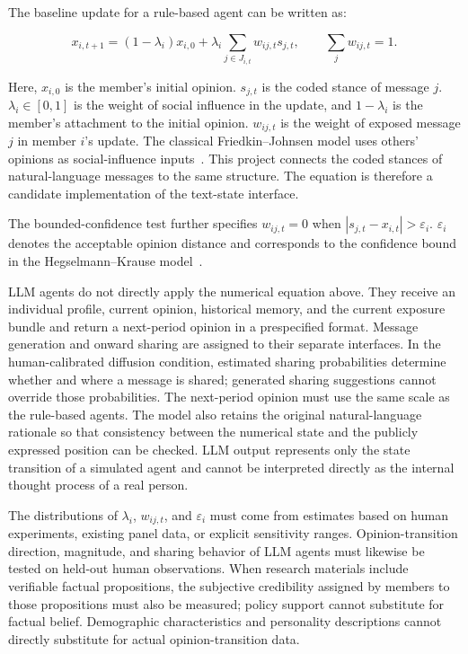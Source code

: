 \documentclass[11pt,a4paper]{article}
\begin{document}
The baseline update for a rule-based agent can be written as:

\begin{equation*}
x_{i,t+1}
=
(1-\lambda_i)x_{i,0}
+
\lambda_i
\sum_{j\in J_{i,t}}
w_{ij,t}s_{j,t},
\qquad
\sum_jw_{ij,t}=1.
\end{equation*}

Here, $x_{i,0}$ is the member's initial opinion. $s_{j,t}$ is the coded stance of message $j$. $\lambda_i\in[0,1]$ is the weight of social influence in the update, and $1-\lambda_i$ is the member's attachment to the initial opinion. $w_{ij,t}$ is the weight of exposed message $j$ in member $i$'s update. The classical Friedkin--Johnsen model uses others' opinions as social-influence inputs~\citep{friedkin1990}. This project connects the coded stances of natural-language messages to the same structure. The equation is therefore a candidate implementation of the text-state interface.

The bounded-confidence test further specifies $w_{ij,t}=0$ when $|s_{j,t}-x_{i,t}|>\varepsilon_i$. $\varepsilon_i$ denotes the acceptable opinion distance and corresponds to the confidence bound in the Hegselmann--Krause model~\citep{hegselmann2002}.

LLM agents do not directly apply the numerical equation above. They receive an individual profile, current opinion, historical memory, and the current exposure bundle and return a next-period opinion in a prespecified format. Message generation and onward sharing are assigned to their separate interfaces. In the human-calibrated diffusion condition, estimated sharing probabilities determine whether and where a message is shared; generated sharing suggestions cannot override those probabilities. The next-period opinion must use the same scale as the rule-based agents. The model also retains the original natural-language rationale so that consistency between the numerical state and the publicly expressed position can be checked. LLM output represents only the state transition of a simulated agent and cannot be interpreted directly as the internal thought process of a real person.

The distributions of $\lambda_i$, $w_{ij,t}$, and $\varepsilon_i$ must come from estimates based on human experiments, existing panel data, or explicit sensitivity ranges. Opinion-transition direction, magnitude, and sharing behavior of LLM agents must likewise be tested on held-out human observations. When research materials include verifiable factual propositions, the subjective credibility assigned by members to those propositions must also be measured; policy support cannot substitute for factual belief. Demographic characteristics and personality descriptions cannot directly substitute for actual opinion-transition data.
\end{document}
